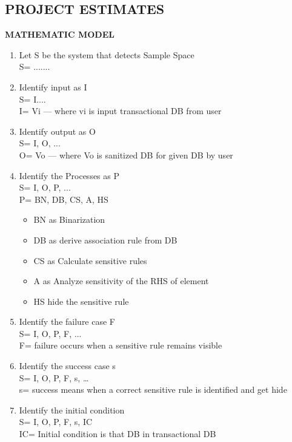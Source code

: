 \documentclass[12pt]{report}
\begin{document}
\subsection{PROJECT ESTIMATES}
\large\textbf{MATHEMATIC MODEL}
\justifying
\setlength{\parindent}{4em}
\setlength{\parskip}{0.5em}
\renewcommand{\baselinestretch}{1.5}
\vspace{0.1cm}
\begin{enumerate}
\item Let S be the system that detects Sample Space\\
S= {.......}


\item  Identify input as I\\
S= {I....}\\
I= {Vi — where vi is input transactional DB from user}

\item  Identify output as O\\
S= {I, O, ...}\\
O= {Vo — where Vo is sanitized DB for given DB by user}

\item  Identify the Processes as P\\
S= {I, O, P, ...}\\
P= {BN, DB, CS, A, HS}
\begin{itemize}
\item  BN as Binarization
\item DB as derive association rule from DB
\item CS as Calculate sensitive rules
\item A as Analyze sensitivity of the RHS of element
\item HS hide the sensitive rule
\end{itemize}

\item Identify the failure case F\\
S= {I, O, P, F, ...}\\
F= {failure occurs when a sensitive rule remains visible}

\item  Identify the success case s\\
S= {I, O, P, F, s, …}\\
s= {success means when a correct sensitive rule is identified and get hide}

\item Identify the initial condition\\
S= {I, O, P, F, s, IC}\\
IC= {Initial condition is that DB in transactional DB} 

\end{enumerate}
\end{document}
